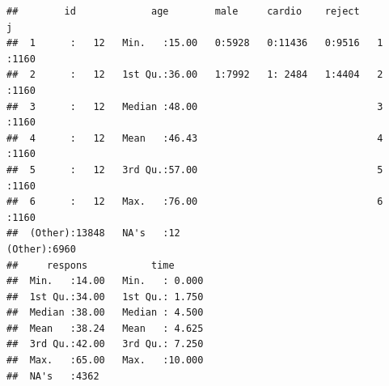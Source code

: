 \documentclass[
]{article}
\newenvironment{Shaded}{\begin{snugshade}}{\end{snugshade}}
\newcommand{\AttributeTok}[1]{\textcolor[rgb]{0.77,0.63,0.00}{#1}}
\newcommand{\FunctionTok}[1]{\textcolor[rgb]{0.00,0.00,0.00}{#1}}
\newcommand{\NormalTok}[1]{#1}
\newcommand{\OtherTok}[1]{\textcolor[rgb]{0.56,0.35,0.01}{#1}}
\newcommand{\SpecialCharTok}[1]{\textcolor[rgb]{0.00,0.00,0.00}{#1}}
\begin{document}
\begin{Shaded}
\end{Shaded}

\begin{verbatim}
##        id             age        male     cardio    reject         j       
##  1      :   12   Min.   :15.00   0:5928   0:11436   0:9516   1      :1160  
##  2      :   12   1st Qu.:36.00   1:7992   1: 2484   1:4404   2      :1160  
##  3      :   12   Median :48.00                               3      :1160  
##  4      :   12   Mean   :46.43                               4      :1160  
##  5      :   12   3rd Qu.:57.00                               5      :1160  
##  6      :   12   Max.   :76.00                               6      :1160  
##  (Other):13848   NA's   :12                                  (Other):6960  
##     respons           time       
##  Min.   :14.00   Min.   : 0.000  
##  1st Qu.:34.00   1st Qu.: 1.750  
##  Median :38.00   Median : 4.500  
##  Mean   :38.24   Mean   : 4.625  
##  3rd Qu.:42.00   3rd Qu.: 7.250  
##  Max.   :65.00   Max.   :10.000  
##  NA's   :4362
\end{verbatim}
\end{document}
